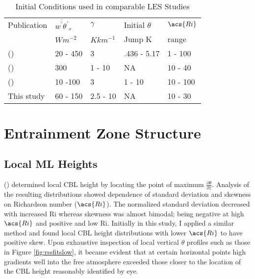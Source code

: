 \begin{table}[htbp]
\caption[Initial conditions used in comparable \acs{LES} Studies]{Initial Conditions used in comparable \acs{LES} Studies}

    \begin{center}
    \begin{tabular}{ p{4cm} p{1.4cm} p{1.4cm} p{1.7cm} p{1.8cm}}
Publication & $\overline{w^{'}\theta^{'}}_{s}$& $\gamma$& Initial $\theta$ & $\acs{Ri}$ \\ 
& $Wm^{-2}$ & $Kkm^{-1}$ & Jump K & range \\ \hline
      \citeauthor{SullMoengStev} (\citeyear{SullMoengStev}) & 20 - 450& 3  &.436 - 5.17 & 1 - 100\\ %
      \citeauthor{FedConzMir04} (\citeyear{FedConzMir04}) & 300 & 1 - 10 & NA & 10 - 40\\ %
      \citeauthor{BrooksFowler2} (\citeyear{BrooksFowler2}) &  10 -100 &  3& 1 - 10 &10 - 100 \\ %
      This study & 60 - 150 & 2.5 - 10& NA & 10 - 30\\ \hline 
      
    \end{tabular}
\label{table:initconditcomp}   
\end{center}    
\end{table}


\section{Entrainment Zone Structure}
\label{sec:entzonestruc}
\subsection{Local \acs{ML} Heights}

\citeauthor{SullMoengStev} (\citeyear{SullMoengStev}) determined local \acs{CBL} height by locating the point of maximum $\frac{\partial \theta}{\partial z}$.  Analysis of the resulting distributions showed dependence of standard deviation and skewness on Richardson number ($\acs{Ri}$).  The normalized standard deviation decreased with increased \acs{Ri} whereas skewness was almost bimodal; being negative at high $\acs{Ri}$ and positive and low \acs{Ri}.  Initially in this study, I applied a similar method and found local \acs{CBL} height distributions with lower $\acs{Ri}$ to have positive skew.  Upon exhaustive inspection of local vertical $\theta$  profiles such as those in Figure \ref{fig:rssfitslow}, it became evident that at certain horizontal points high gradients well into the free atmosphere exceeded those closer to the location of the \acs{CBL} height reasonably identified by eye.\\


